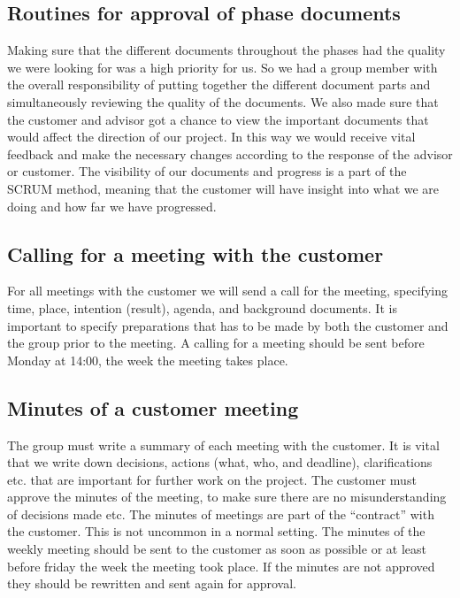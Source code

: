 \subsection{Routines for approval of phase documents}
Making sure that the different documents throughout the phases had the quality we were looking for was a high priority for us. So we had a group member with the overall responsibility of putting together the different document parts and simultaneously reviewing the quality of the documents.
\newline
\newline 
We also made sure that the customer and advisor got a chance to view the important documents that would affect the direction of our project. In this way we would receive vital feedback and make the necessary changes according to the response of the advisor or customer. 
\newline
\newline
The visibility of our documents and progress is a part of the SCRUM method, meaning that the customer will have insight into what we are doing and how far we have progressed.   

\subsection{Calling for a meeting with the customer}
For all meetings with the customer we will send a call for the meeting, specifying time, place, intention (result), agenda, and background documents. It is important to specify preparations that has to be made by both the customer and the group prior to the meeting.
\newline
\newline
A calling for a meeting should be sent before Monday at 14:00, the week the meeting takes place.

\subsection{Minutes of a customer meeting}
The group must write a summary of each meeting with the customer. It is vital that we write down decisions, actions (what, who, and deadline), clarifications etc. that are important for further work on the project. The customer must approve the minutes of the meeting, to make sure there are no misunderstanding of decisions made etc. The minutes of meetings are part of the “contract” with the customer. This is not uncommon in a normal setting.
\newline
\newline
The minutes of the weekly meeting should be sent to the customer as soon as possible or at least before friday the week the meeting took place. If the minutes are not approved they should be rewritten and sent again for approval. 

